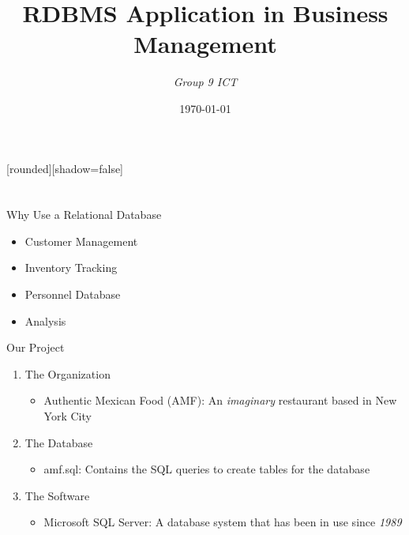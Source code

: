 \documentclass[14pt, c]{beamer}
\author{\emph{Group 9 ICT}}
\date{\today}
\title{RDBMS Application in Business Management}
\begin{document}
\maketitle
{}
[rounded][shadow=false]

\section{}
\label{sec-1}
\begin{frame}[label=sec-1-1]{Why Use a Relational Database}
\begin{block}{}
\begin{itemize}
\item Customer Management\pause
\item Inventory Tracking\pause
\item Personnel Database\pause
\item Analysis
\end{itemize}
\end{block}
\end{frame}

\begin{frame}[label=sec-1-2]{Our Project}
\begin{block}{}
\begin{enumerate}
\item The Organization
\begin{itemize}
\item \alert{Authentic Mexican Food (AMF)}: An \emph{imaginary} restaurant based in New York City\pause
\end{itemize}
\item The Database
\begin{itemize}
\item \alert{amf.sql}: Contains the SQL queries to create tables for the database\pause
\end{itemize}
\item The Software
\begin{itemize}
\item \alert{Microsoft SQL Server}: A database system that has been in use since \emph{1989}
\end{itemize}
\end{enumerate}
\end{block}
\end{frame}
\end{document}
